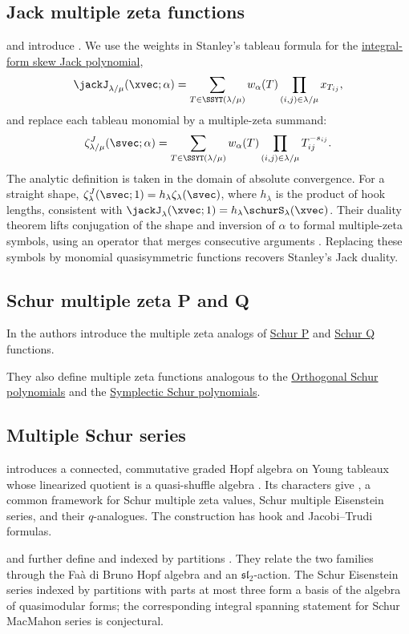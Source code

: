 \subsection[jackMultipleZeta]{Jack multiple zeta functions}

 and  introduce
 \cite{NakasujiTakeda2026x}.
We use the weights in Stanley's tableau formula for the
\hyperref[jackSkew]{integral-form skew Jack polynomial},
\[
 \jackJ_{\lambda/\mu}(\xvec;\alpha)
 =\sum_{T\in\SSYT(\lambda/\mu)}w_\alpha(T)
   \prod_{(i,j)\in\lambda/\mu}x_{T_{ij}},
\]
and replace each tableau monomial by a multiple-zeta summand:
\[
 \zeta^J_{\lambda/\mu}(\svec;\alpha)
 =\sum_{T\in\SSYT(\lambda/\mu)}w_\alpha(T)
   \prod_{(i,j)\in\lambda/\mu}T_{ij}^{-s_{ij}}.
\]
The analytic definition is taken in the domain of absolute convergence.
For a straight shape, $\zeta^J_\lambda(\svec;1)
=h_\lambda\zeta_\lambda(\svec)$, where $h_\lambda$ is the product of hook
lengths, consistent with $\jackJ_\lambda(\xvec;1)=h_\lambda\schurS_\lambda(\xvec)$.
Their duality theorem lifts conjugation of the shape and inversion of
$\alpha$ to formal multiple-zeta symbols, using an operator that merges
consecutive arguments \cite[Thm.~4.21]{NakasujiTakeda2026x}.
Replacing these symbols by monomial quasisymmetric functions recovers
Stanley's Jack duality.

\subsection[schurZetaP]{Schur multiple zeta P and Q}

In \cite{NakasujiTakeda2022x} the authors introduce the multiple zeta
analogs of \hyperref[schurP]{Schur P} and \hyperref[schurQ]{Schur Q} functions.

They also define multiple zeta functions analogous to the
\hyperref[schurOrthogonal]{Orthogonal Schur polynomials} and the
\hyperref[schurSymplectic]{Symplectic Schur polynomials}.

\subsection[multipleSchurSeries]{Multiple Schur series}

 introduces a connected, commutative graded Hopf algebra on
Young tableaux whose linearized quotient is a quasi-shuffle algebra
\cite{Yu2026x}.  Its characters give 
\label{multipleSchurSeriesDefinition}, a common framework for Schur multiple
zeta values, Schur multiple Eisenstein series, and their $q$-analogues.  The
construction has hook and Jacobi--Trudi formulas.

 and  further define
 and 
\label{schurEisensteinSeriesDefinition} indexed by partitions
\cite{BachmannYu2026x}.  They relate the two families through the
Faà di Bruno Hopf algebra and an $\mathfrak{sl}_2$-action.  The Schur
Eisenstein series indexed by partitions with parts at most three form a basis
of the algebra of quasimodular forms; the corresponding integral spanning
statement for Schur MacMahon series is conjectural.
